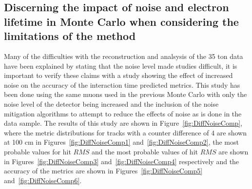 \subsection{Discerning the impact of noise and electron lifetime in Monte Carlo when considering the limitations of the method} \label{sec:DiffMCStudies}
Many of the difficulties with the reconstruction and analsysis of the 35 ton data have been explained by stating that the noise level made studies difficult, it is important to verify these claims with a study showing the effect of increased noise on the accuracy of the interaction time predicted metrics. This study has been done using the same muons used in the previous Monte Carlo with only the noise level of the detector being increased and the inclusion of the noise mitigation algorithms to attempt to reduce the effects of noise as is done in the data sample. The results of this study are shown in Figure~\ref{fig:DiffNoiseComp}, where the metric distributions for tracks with a counter difference of 4 are shown at 100 cm in Figures~\ref{fig:DiffNoiseComp1} and~\ref{fig:DiffNoiseComp2}, the most probable values for hit $RMS$ and the most probable values of hit $RMS$ are shown in Figures~\ref{fig:DiffNoiseComp3} and~\ref{fig:DiffNoiseComp4} respectively and the accuracy of the metrics are shown in Figures~\ref{fig:DiffNoiseComp5} and~\ref{fig:DiffNoiseComp6}. \\

